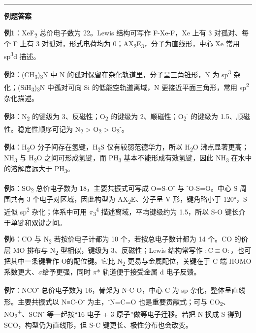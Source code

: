 \documentclass[a4paper,11pt]{ctexart}
\newcommand{\箭}{\ensuremath{\rightarrow}}
\newcommand{\左箭}{\ensuremath{\leftarrow}}
\newcommand{\上箭}{\ensuremath{\uparrow}}
\newcommand{\下箭}{\ensuremath{\downarrow}}
\newcommand{\衡}{\ensuremath{\rightleftharpoons}}
\newcommand{\双箭}{\ensuremath{\leftrightarrow}}
\newcommand{\约等于}{\ensuremath{\approx}}
\newcommand{\小于等于}{\ensuremath{\leq}}
\newcommand{\大于等于}{\ensuremath{\geq}}
\newcommand{\不等于}{\ensuremath{\neq}}
\newcommand{\西格马}{\ensuremath{\sigma}}
\newcommand{\派}{\ensuremath{\pi}}
\begin{document}
\begin{center}\rule{0.5\linewidth}{0.5pt}\end{center}

\textbf{例题答案}

\textbf{例1}：XeF\textsubscript{2} 总价电子数为 22。Lewis 结构可写作 F-Xe-F，Xe 上有 3 对孤对、每个 F 上有 3 对孤对，形式电荷均为 0；AX\textsubscript{2}E\textsubscript{3}，分子为直线形，中心 Xe 常用 sp\textsuperscript{3}d 描述。

\textbf{例2}：(CH\textsubscript{3})\textsubscript{3}N 中 N 的孤对保留在杂化轨道里，分子呈三角锥形，N 为 sp\textsuperscript{3} 杂化；(SiH\textsubscript{3})\textsubscript{3}N 中孤对可向 Si 的低能空轨道离域，N 更接近平面三角形，常用 sp\textsuperscript{2} 杂化描述。

\textbf{例3}：N\textsubscript{2} 的键级为 3、反磁性；O\textsubscript{2} 的键级为 2、顺磁性；O\textsubscript{2}\textsuperscript{-} 的键级为 1.5、顺磁性。稳定性顺序可记为 N\textsubscript{2} \textgreater{} O\textsubscript{2} \textgreater{} O\textsubscript{2}\textsuperscript{-}。

\textbf{例4}：H\textsubscript{2}O 分子间存在氢键，H\textsubscript{2}S 仅有较弱范德华力，所以 H\textsubscript{2}O 沸点显著更高；NH\textsubscript{3} 与 H\textsubscript{2}O 之间可形成氢键，而 PH\textsubscript{3} 基本不能形成有效氢键，因此 NH\textsubscript{3} 在水中的溶解度远大于 PH\textsubscript{3}。

\textbf{例5}：SO\textsubscript{2} 总价电子数为 18，主要共振式可写成 O=S-O\textsuperscript{-} 与 \textsuperscript{-}O-S=O。中心 S 周围共有 3 个电子对区域，因此构型为 AX\textsubscript{2}E、分子呈 V 形，键角略小于 120°，S 近似 sp\textsuperscript{2} 杂化；体系中可用 \派\textsubscript{3}\textsuperscript{4} 描述离域，平均键级约为 1.5，所以 S-O 键长介于单键和双键之间。

\textbf{例6}：CO 与 N\textsubscript{2} 若按价电子计都为 10 个，若按总电子数计都为 14 个。CO 的价层 MO 排布与 N\textsubscript{2} 型相似，键级为 3、反磁性；Lewis 结构常写作 \(\mathrm{:C\equiv O:}\)，也可把其中一条键看作 O 的配位键。它比 N\textsubscript{2} 更易与金属配位，关键在于 C 端 HOMO 系数更大、\西格马 给予更强，同时 \派* 轨道便于接受金属 d 电子反馈。

\textbf{例7}：NCO\textsuperscript{-} 总价电子数为 16，骨架为 N-C-O，中心 C 为 sp 杂化，整体呈直线形。主要共振式以 N≡C-O\textsuperscript{-} 为主，\textsuperscript{-}N=C=O 也是重要贡献式；可与 CO\textsubscript{2}、NO\textsubscript{2}\textsuperscript{+}、SCN\textsuperscript{-} 等一起按``16 电子 + 3 原子''做等电子迁移。若把 N 换成 S 得到 SCO，构型仍为直线形，但 S-C 键更长、极性分布也会改变。
\end{document}
